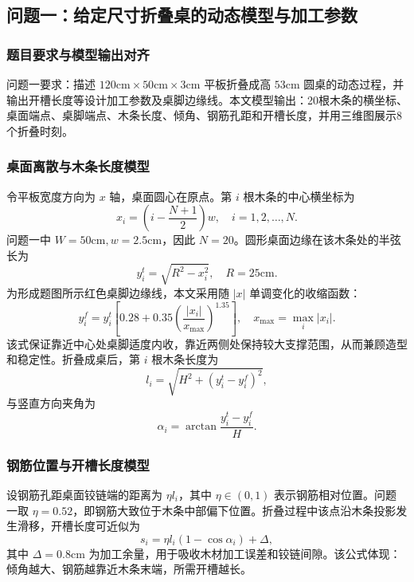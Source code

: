 \documentclass[UTF8,a4paper,12pt]{ctexart}
\newcommand{\cm}{\mathrm{cm}}
\begin{document}
\subsection{问题一：给定尺寸折叠桌的动态模型与加工参数}
\subsubsection{题目要求与模型输出对齐}
问题一要求：描述 $120\cm\times50\cm\times3\cm$ 平板折叠成高 $53\cm$ 圆桌的动态过程，并输出开槽长度等设计加工参数及桌脚边缘线。本文模型输出：20根木条的横坐标、桌面端点、桌脚端点、木条长度、倾角、钢筋孔距和开槽长度，并用三维图展示8个折叠时刻。

\subsubsection{桌面离散与木条长度模型}
令平板宽度方向为 $x$ 轴，桌面圆心在原点。第 $i$ 根木条的中心横坐标为
\begin{equation}
 x_i=\left(i-\frac{N+1}{2}\right)w,\quad i=1,2,\ldots,N.
\end{equation}
问题一中 $W=50\cm,w=2.5\cm$，因此 $N=20$。圆形桌面边缘在该木条处的半弦长为
\begin{equation}
 y_i^t=\sqrt{R^2-x_i^2},\quad R=25\cm.
\end{equation}
为形成题图所示红色桌脚边缘线，本文采用随 $|x|$ 单调变化的收缩函数：
\begin{equation}
 y_i^f=y_i^t\left[0.28+0.35\left(\frac{|x_i|}{x_{\max}}\right)^{1.35}\right],\quad x_{\max}=\max_i |x_i|.
\end{equation}
该式保证靠近中心处桌脚适度内收，靠近两侧处保持较大支撑范围，从而兼顾造型和稳定性。折叠成桌后，第 $i$ 根木条长度为
\begin{equation}
 l_i=\sqrt{H^2+(y_i^t-y_i^f)^2},
\end{equation}
与竖直方向夹角为
\begin{equation}
 \alpha_i=\arctan\frac{y_i^t-y_i^f}{H}.
\end{equation}

\subsubsection{钢筋位置与开槽长度模型}
设钢筋孔距桌面铰链端的距离为 $\eta l_i$，其中 $\eta\in(0,1)$ 表示钢筋相对位置。问题一取 $\eta=0.52$，即钢筋大致位于木条中部偏下位置。折叠过程中该点沿木条投影发生滑移，开槽长度可近似为
\begin{equation}
 s_i=\eta l_i(1-\cos\alpha_i)+\Delta,
\end{equation}
其中 $\Delta=0.8\cm$ 为加工余量，用于吸收木材加工误差和铰链间隙。该公式体现：倾角越大、钢筋越靠近木条末端，所需开槽越长。
\end{document}
